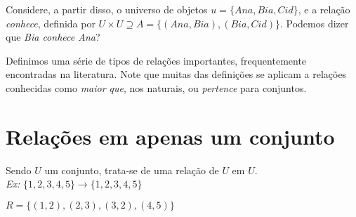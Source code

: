 Considere, a partir disso, o universo de objetos $u = \{Ana, Bia, Cid\}$, e a relação \textit{conhece}, definida por $U\times U \supseteq A = \{(Ana, Bia), (Bia, Cid)\}$. Podemos dizer que \textit{Bia conhece Ana}?

Definimos uma série de tipos de relações importantes, frequentemente encontradas na literatura.
Note que muitas das definições se aplicam a relações conhecidas como \textit{maior que}, nos naturais, ou \textit{pertence} para conjuntos.

\section{Relações em apenas um conjunto}

Sendo $U$ um conjunto, trata-se de uma relação de $U$ em $U$.\\

\textit{Ex:} $\{1,2,3,4,5\} \rightarrow  \{1,2,3,4,5\}$

$R = \{(1,2),(2,3),(3,2),(4,5)\}$

